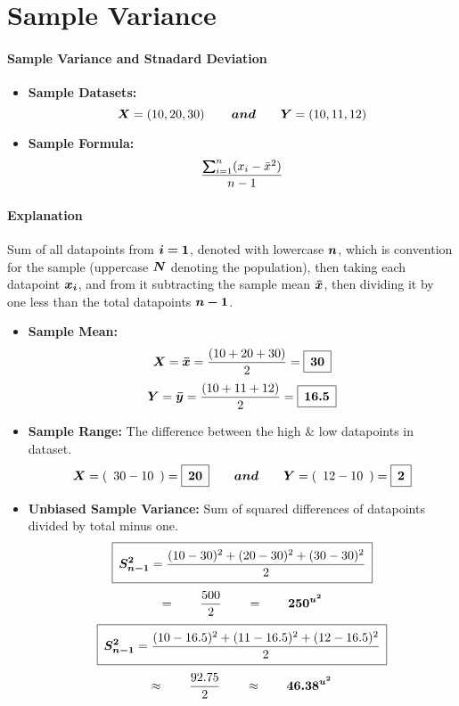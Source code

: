 \documentclass[12pt]{article}
\newcommand\padBox[1]{{\setlength\fboxsep{5pt}\boxed{#1}}}
\newcommand{\negBi}[3][2]{(#2- #3)^{#1}}
\newcommand*{\mB}[1]{\ifmmode\bm{#1}\else\textbf{#1}\fi}
\begin{document}
\section*{Sample Variance}
\begingroup
	\paragraph{Sample Variance and Stnadard Deviation}%
	\large
	\begin{itemize}
		\item\textbf{Sample Datasets:}
			\[
				\mB{X}=
				\left(10, 20, 30\right)
				\qquad\mB{and}\qquad
				\mB{Y}=
				\left(10, 11, 12\right)
			\]
		\item\textbf{Sample Formula:}
			\[
				{\frac{\mB{\sum}_{i=1}^{n}(x_{i}-\bar{x}^{2})}{n- 1}}
			\]
	\end{itemize}

\paragraph{Explanation}%

Sum of all datapoints from $\mB{i=1}$, denoted with lowercase $\mB{n}$,
which is convention for the sample (uppercase $\mB{N}$ denoting the
population), then taking each datapoint $\mB{x_{i}}$, and from it
subtracting the sample mean $\mB{\bar{x}}$, then dividing it by one
less than the total datapoints $\mB{n - 1}$.

	\begin{itemize}
		\item\textbf{Sample Mean:}
			\[
				\mB{X}=
				\mB{\bar{x}}=\frac{\left(10 + 20 + 30\right)}{2}=
				\padBox{\mB{30}}
			\]
			\[
				\mB{Y}=
				\mB{\bar{y}}=\frac{\left(10 + 11 + 12\right)}{2}=
				\padBox{\mB{16.5}}
			\]
		\item\textbf{Sample Range: }
			The difference between the high \& low datapoints in dataset.
			\[
				\mB{X}=
				(\enspace30 - 10\enspace) = \padBox{\mB{20}}
				\qquad\mB{and}\qquad
				\mB{Y}=
				(\enspace12 - 10\enspace) = \padBox{\mB{2}}
			\]
		\item\textbf{Unbiased Sample Variance: }
		Sum of squared differences of datapoints divided by total minus one.
			\[\padBox{
				\mB{S_{n-1}^{2}}=\frac{\negBi{10}{30} +
					\negBi{20}{30} +
					\negBi{30}{30}
				}
				{2}
			}\]
			\[=\qquad\frac{500}{2}\qquad=\qquad\mB{250^{u^2}}\]
			\[\padBox{
				\mB{S_{n-1}^{2}}=\frac{\negBi{10}{16.5} +
					\negBi{11}{16.5} +
					\negBi{12}{16.5}
				}
			{2}
			}\]
			\[
				\approx\qquad\frac{92.75}{2}\qquad\approx\qquad\mB{46.38^{u^2}}
			\]
	\end{itemize}
\end{document}
